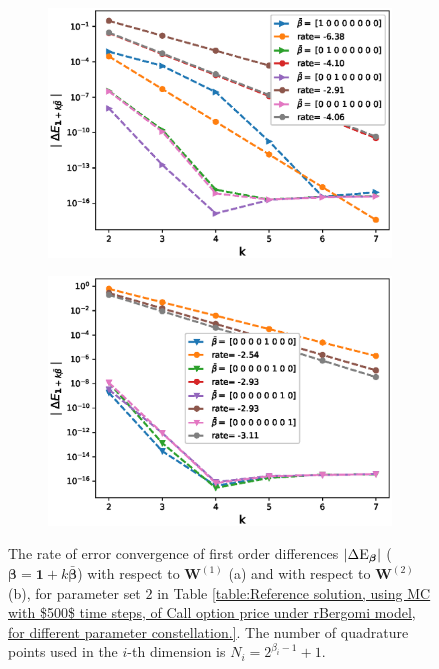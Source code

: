 \begin{figure}[h!]
	\centering
	\begin{subfigure}{.4\textwidth}
		\centering
		\includegraphics[width=1\linewidth]{./figures/rBergomi_mixed_error_rates/without_change_measure/N_4/H_002/first_difference_rbergomi_4steps_H_002_K_1_totally_hierarch_with_rate_W1}
		\caption{}
		\label{fig:sub3}
	\end{subfigure}%
	\begin{subfigure}{.4\textwidth}
		\centering
		\includegraphics[width=1\linewidth]{./figures/rBergomi_mixed_error_rates/without_change_measure/N_4/H_002/first_difference_rbergomi_4steps_H_002_K_1_totally_hierarch_with_rate_W2}
		\caption{}
		\label{fig:sub4}
	\end{subfigure}
	
	
	
	\caption{The rate of error convergence of first order differences $\left\lvert\Delta \text{E}_{\boldsymbol{\beta}}\right\rvert$ ($\boldsymbol{\beta}=\mathbf{1}+k \bar{\boldsymbol{\beta}}$) with respect to $\mathbf{W}^{(1)}$ (a)  and  with respect to $\mathbf{W}^{(2)}$ (b), for parameter set $2$ in Table \ref{table:Reference solution, using MC with $500$ time steps, of Call option price under rBergomi model, for different parameter constellation.}. The number of quadrature points used in the $i$-th dimension is $N_i=2^{\beta_i-1}+1$. }
	\label{fig:first_diff_comp_K_1_H_002}
\end{figure}


